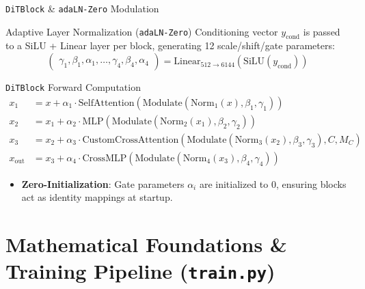 \documentclass[t]{beamer}
\begin{document}
\begin{frame}{\texttt{DiTBlock} \& \texttt{adaLN-Zero} Modulation}
    \begin{block}{Adaptive Layer Normalization (\texttt{adaLN-Zero})}
        Conditioning vector $y_{\text{cond}}$ is passed to a SiLU + Linear layer per block, generating 12 scale/shift/gate parameters:
        $$\begin{pmatrix} \gamma_1, \beta_1, \alpha_1, \dots, \gamma_4, \beta_4, \alpha_4 \end{pmatrix} = \mathrm{Linear}_{512 \to 6144}(\mathrm{SiLU}(y_{\text{cond}}))$$
    \end{block}

    \begin{block}{\texttt{DiTBlock} Forward Computation}
        \begin{align*}
            x_1 &= x + \alpha_1 \cdot \mathrm{SelfAttention}(\mathrm{Modulate}(\mathrm{Norm}_1(x), \beta_1, \gamma_1)) \\
            x_2 &= x_1 + \alpha_2 \cdot \mathrm{MLP}(\mathrm{Modulate}(\mathrm{Norm}_2(x_1), \beta_2, \gamma_2)) \\
            x_3 &= x_2 + \alpha_3 \cdot \mathrm{CustomCrossAttention}(\mathrm{Modulate}(\mathrm{Norm}_3(x_2), \beta_3, \gamma_3), C, M_C) \\
            x_{\text{out}} &= x_3 + \alpha_4 \cdot \mathrm{CrossMLP}(\mathrm{Modulate}(\mathrm{Norm}_4(x_3), \beta_4, \gamma_4))
        \end{align*}
    \end{block}

    \begin{itemize}
        \item \textbf{Zero-Initialization}: Gate parameters $\alpha_i$ are initialized to 0, ensuring blocks act as identity mappings at startup.
    \end{itemize}
\end{frame}

\section{Mathematical Foundations \& Training Pipeline (\texttt{train.py})}
\end{document}
